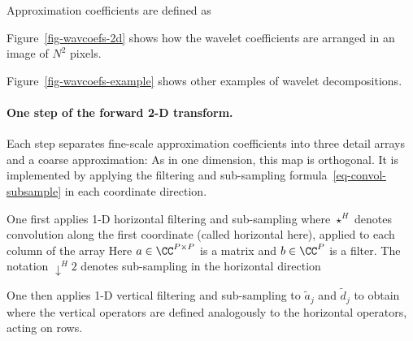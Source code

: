Approximation coefficients are defined as


Figure~\ref{fig-wavcoefs-2d} shows how the wavelet coefficients are arranged in an image of $N^2$ pixels.
 
Figure~\ref{fig-wavcoefs-example} shows other examples of wavelet decompositions.


  
\paragraph{One step of the forward 2-D transform.}

Each step separates fine-scale approximation coefficients into three detail arrays and a coarse approximation:
As in one dimension, this map is orthogonal. It is implemented by applying the filtering and sub-sampling formula~\eqref{eq-convol-subsample} in each coordinate direction.

One first applies 1-D horizontal filtering and sub-sampling
where $\star^H$ denotes convolution along the first coordinate (called horizontal here), applied to each column of the array
Here $a\in\CC^{P\times P}$ is a matrix and $b\in\CC^P$ is a filter. The notation $\downarrow^H 2$ denotes sub-sampling in the horizontal direction

One then applies 1-D vertical filtering and sub-sampling to $\tilde a_j$ and $\tilde d_j$ to obtain
where the vertical operators are defined analogously to the horizontal operators, acting on rows.


